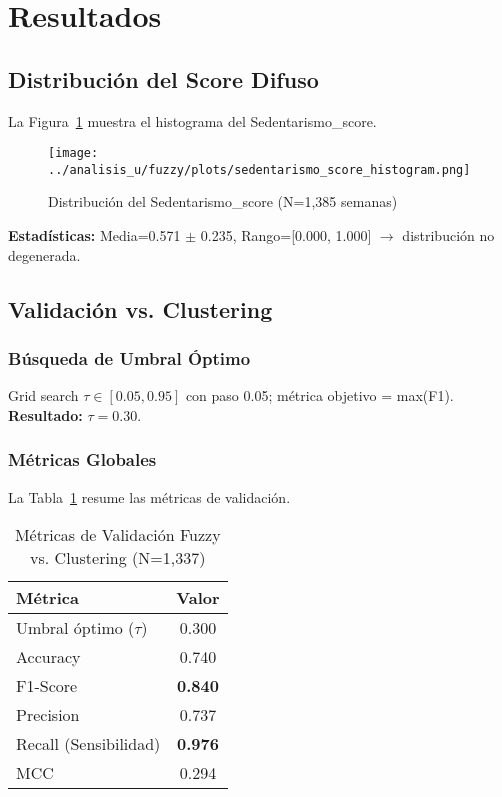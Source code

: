 \documentclass[12pt,a4paper,twoside]{article}
\begin{document}
\section{Resultados}

\subsection{Distribución del Score Difuso}

La Figura~\ref{fig:score_hist} muestra el histograma del Sedentarismo\_score.

\begin{figure}[h]
\centering
\texttt{[image: ../analisis\_u/fuzzy/plots/sedentarismo\_score\_histogram.png]}
\caption{Distribución del Sedentarismo\_score (N=1,385 semanas)}
\label{fig:score_hist}
\end{figure}

\textbf{Estadísticas:} Media=0.571 $\pm$ 0.235, Rango=[0.000, 1.000] $\rightarrow$ distribución no degenerada.

\subsection{Validación vs. Clustering}

\subsubsection{Búsqueda de Umbral Óptimo}

Grid search $\tau \in [0.05, 0.95]$ con paso 0.05; métrica objetivo = max(F1). \textbf{Resultado:} $\tau=0.30$.

\subsubsection{Métricas Globales}

La Tabla~\ref{tab:metricas_globales} resume las métricas de validación.

\begin{table}[h]
\centering
\caption{Métricas de Validación Fuzzy vs. Clustering (N=1,337)}
\label{tab:metricas_globales}
\begin{tabular}{lc}
\toprule
\textbf{Métrica} & \textbf{Valor} \\
\midrule
Umbral óptimo ($\tau$) & 0.300 \\
Accuracy & 0.740 \\
F1-Score & \textbf{0.840} \\
Precision & 0.737 \\
Recall (Sensibilidad) & \textbf{0.976} \\
MCC & 0.294 \\
\bottomrule
\end{tabular}
\end{table}
\end{document}
